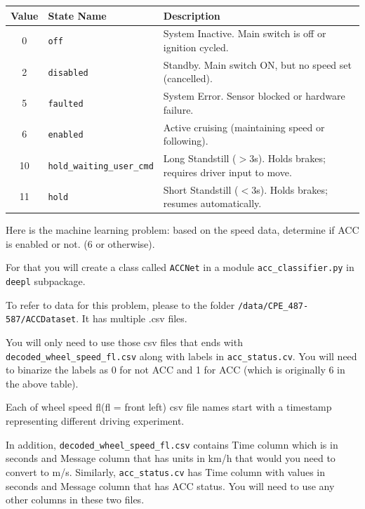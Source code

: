 \documentclass[12pt, xcolor=dvipsnames,svgnames,x11names]{article}
\begin{document}
\begin{tabular}{c l p{7cm}} 
        \toprule
        \textbf{Value} & \textbf{State Name} & \textbf{Description} \\
        \midrule
        0 & \texttt{off} & System Inactive. Main switch is off or ignition cycled. \\
        2 & \texttt{disabled} & Standby. Main switch ON, but no speed set (cancelled). \\
        5 & \texttt{faulted} & System Error. Sensor blocked or hardware failure. \\
        6 & \texttt{enabled} & Active cruising (maintaining speed or following). \\
        10 & \texttt{hold\_waiting\_user\_cmd} & Long Standstill ($>3$s). Holds brakes; requires driver input to move. \\
        11 & \texttt{hold} & Short Standstill ($<3$s). Holds brakes; resumes automatically. \\
        \bottomrule
    \end{tabular}
    
    \vspace{10pt}
    
    

  
Here is the machine learning problem: based on the speed data, determine if ACC is enabled or not. (6 or otherwise).


For that you will create a class called \texttt{ACCNet} in a module \texttt{acc\_classifier.py} in \texttt{deepl} subpackage.


To refer to data for this problem, please to the folder  \texttt{/data/CPE\_487-587/ACCDataset}. It has multiple .csv files. 

You will only need to use those csv files that ends with \texttt{decoded\_wheel\_speed\_fl.csv} along with labels in \texttt{acc\_status.cv}. You will need to binarize the labels as 0 for not ACC and 1 for ACC (which is originally 6 in the above table).

Each of wheel speed fl(fl = front left) csv file names start with a timestamp representing different driving experiment.

In addition, \texttt{decoded\_wheel\_speed\_fl.csv} contains Time column which is in seconds and Message column that has units in km/h that would you need to convert to m/s. Similarly, \texttt{acc\_status.cv} has Time column with values in seconds and Message column that has ACC status. You will need to use any other columns in these two files.
\end{document}
